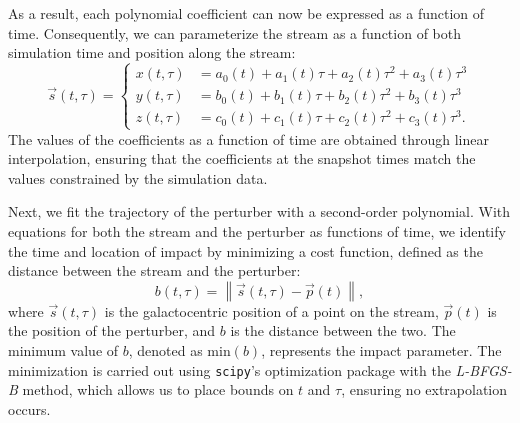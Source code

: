 \documentclass{aa}
\begin{document}
\begin{appendix}
      As a result, each polynomial coefficient can now be expressed as a function of time. Consequently, we can parameterize the stream as a function of both simulation time and position along the stream:
      \begin{equation}
        \vec{s}(t,\tau) = 
        \left\{
        \begin{aligned}
          x(t,\tau) &= a_0(t) + a_1(t)\tau + a_2(t) \tau^2 + a_3(t)\tau^3 \\ 
          y(t,\tau) &= b_0(t) + b_1(t)\tau + b_2(t) \tau^2 + b_3(t)\tau^3 \\
          z(t,\tau) &= c_0(t) + c_1(t)\tau + c_2(t) \tau^2 + c_3(t)\tau^3.
          \end{aligned}
        \right.
      \end{equation}
      The values of the coefficients as a function of time are obtained through linear interpolation, ensuring that the coefficients at the snapshot times match the values constrained by the simulation data.

      Next, we fit the trajectory of the perturber with a second-order polynomial. With equations for both the stream and the perturber as functions of time, we identify the time and location of impact by minimizing a cost function, defined as the distance between the stream and the perturber:
      \begin{equation} 
        b(t, \tau) = \left\lVert \vec{s}(t, \tau) - \vec{p}(t) \right\rVert, 
        \end{equation}
      where $\vec{s}(t, \tau)$ is the galactocentric position of a point on the stream, $\vec{p}(t)$ is the position of the perturber, and $b$ is the distance between the two. The minimum value of $b$, denoted as $\text{min}(b)$, represents the impact parameter. The minimization is carried out using \texttt{scipy}'s optimization package with the \textit{L-BFGS-B} method, which allows us to place bounds on $t$ and $\tau$, ensuring no extrapolation occurs.


\end{appendix}
\end{document}
